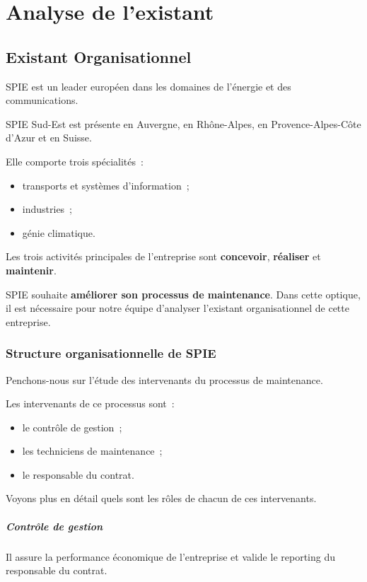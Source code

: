 \chapter{Analyse de l’existant}
\section{Existant Organisationnel}
SPIE est un leader européen dans les domaines de l'énergie et des communications.

SPIE Sud-Est est présente en Auvergne, en Rhône-Alpes, en Provence-Alpes-Côte d'Azur et en Suisse.

Elle comporte trois spécialités~:
\begin{itemize}
	\item transports et systèmes d'information~;
	\item industries~;
	\item génie climatique.\\
\end{itemize}

Les trois activités principales de l'entreprise sont \textbf{concevoir}, \textbf{réaliser} et \textbf{maintenir}.


SPIE souhaite \textbf{améliorer son processus de maintenance}. Dans cette optique, il est nécessaire pour notre équipe d'analyser l'existant organisationnel de cette entreprise.

\subsection{Structure organisationnelle de SPIE}
Penchons-nous sur l'étude des intervenants du processus de maintenance.

Les intervenants de ce processus sont~:
\begin{itemize}
\item le contrôle de gestion~;
\item les techniciens de maintenance~;
\item le responsable du contrat.\\
\end{itemize}

Voyons plus en détail quels sont les rôles de chacun de ces intervenants.

\paragraph{Contrôle de gestion}{Il assure la performance économique de l'entreprise et valide le reporting du responsable du contrat.}
